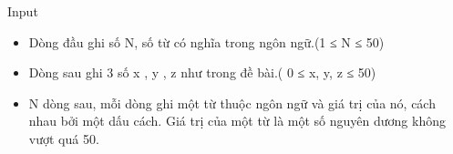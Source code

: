 Input
\begin{itemize}
	\item Dòng đầu ghi số N, số từ có nghĩa trong ngôn ngữ.(1 ≤ N ≤ 50)
	\item Dòng sau ghi 3 số x , y , z như trong đề bài.( 0 ≤ x, y, z ≤ 50)
	\item N dòng sau, mỗi dòng ghi một từ thuộc ngôn ngữ và giá trị của nó, cách nhau bởi một dấu cách. Giá trị của một từ là một số nguyên dương không vượt quá 50.
\end{itemize}